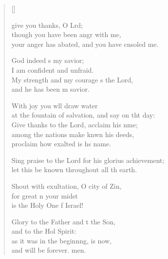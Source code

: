 \settowidth{\versewidth}{Sing praise to the Lord for his glorious achievement; *}
\begin{verse}[\versewidth]
  \begin{patverse}
     give you thanks, O Lrd;\Flex\\
though you have been angr with me,\Med\\
your anger has abated, and you have cnsoled me.

God indeed \pointup{\i}s my savior;\Med\\
I am confident and unfraid.\\
My strength and my courage \pointup{\i}s the Lord,\Med\\
and he has been m savior.

With joy you w\pointup{\i}ll draw water\Med\\
at the fountain of salvation, and say on tht day:\\
Give thanks to the Lord, acclaim his nme;\Flex\\
among the nations make knwn his deeds,\Med\\
proclaim how exalted is h\pointup{\i}s name.

Sing praise to the Lord for his glorius achievement;\Med\\
let this be known throughout all th earth.

Shout with exultation, O city of Zin,\Flex\\
for great \pointup{\i}n your midst\Med\\
is the Holy One f Israel!

Glory to the Father and t the Son,\Med\\
and to the Hol Spirit:\\
as it was in the beginn\pointup{\i}ng, is now,\Med\\
and will be forever. men. 
  \end{patverse}
\end{verse}
